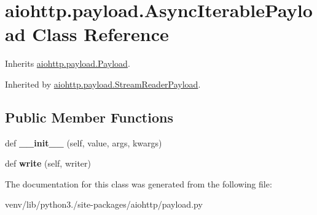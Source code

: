 \hypertarget{classaiohttp_1_1payload_1_1_async_iterable_payload}{}\section{aiohttp.\+payload.\+Async\+Iterable\+Payload Class Reference}
\label{classaiohttp_1_1payload_1_1_async_iterable_payload}


Inherits \hyperlink{classaiohttp_1_1payload_1_1_payload}{aiohttp.\+payload.\+Payload}.



Inherited by \hyperlink{classaiohttp_1_1payload_1_1_stream_reader_payload}{aiohttp.\+payload.\+Stream\+Reader\+Payload}.

\subsection*{Public Member Functions}
\begin{DoxyCompactItemize}
\item 
\mbox{\label{classaiohttp_1_1payload_1_1_async_iterable_payload_a447d4301ff7119ccb939d1c7de7ea58b}} 
def {\bfseries \+\_\+\+\_\+init\+\_\+\+\_\+} (self, value, args, kwargs)
\item 
\mbox{\label{classaiohttp_1_1payload_1_1_async_iterable_payload_a2fadf506b8f7bc5e3eac44dc83e30323}} 
def {\bfseries write} (self, writer)
\end{DoxyCompactItemize}


The documentation for this class was generated from the following file\+:\begin{DoxyCompactItemize}
\item 
venv/lib/python3./site-\/packages/aiohttp/payload.\+py\end{DoxyCompactItemize}
